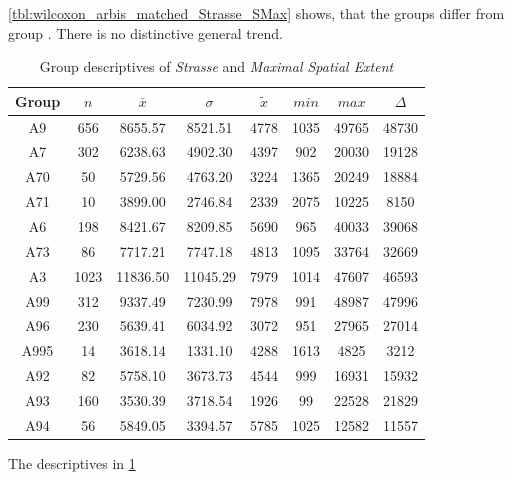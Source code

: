 \cref{tbl:wilcoxon_arbis_matched_Strasse_SMax} shows, that the groups differ from group . There is no distinctive general trend.
\begin{table}[ht!]
	\tiny
	\centering
	\begin{tabular}{c|c|c|c|c|c|c|c}
		\toprule
		Group & $n$ & $\bar{x}$ & $\sigma$ & $\tilde{x}$ & $min$ & $max$ & $\Delta$ \\
		\midrule
		A9   & 656  & 8655.57  & 8521.51  & 4778 & 1035 & 49765 & 48730 \\ 
		A7   & 302  & 6238.63  & 4902.30  & 4397 & 902  & 20030 & 19128 \\ 
		A70  & 50   & 5729.56  & 4763.20  & 3224 & 1365 & 20249 & 18884 \\ 
		A71  & 10   & 3899.00  & 2746.84  & 2339 & 2075 & 10225 & 8150  \\ 
		A6   & 198  & 8421.67  & 8209.85  & 5690 & 965  & 40033 & 39068 \\ 
		A73  & 86   & 7717.21  & 7747.18  & 4813 & 1095 & 33764 & 32669 \\ 
		A3   & 1023 & 11836.50 & 11045.29 & 7979 & 1014 & 47607 & 46593 \\ 
		A99  & 312  & 9337.49  & 7230.99  & 7978 & 991  & 48987 & 47996 \\ 
		A96  & 230  & 5639.41  & 6034.92  & 3072 & 951  & 27965 & 27014 \\ 
		A995 & 14   & 3618.14  & 1331.10  & 4288 & 1613 & 4825  & 3212  \\ 
		A92  & 82   & 5758.10  & 3673.73  & 4544 & 999  & 16931 & 15932 \\ 
		A93  & 160  & 3530.39  & 3718.54  & 1926 & 99   & 22528 & 21829 \\ 
		A94  & 56   & 5849.05  & 3394.57  & 5785 & 1025 & 12582 & 11557 \\ 
		\bottomrule
	\end{tabular}
	\caption{Group descriptives of \textit{Strasse} and \textit{Maximal Spatial Extent}}
	\label{tbl:descriptives_arbis_matched_Strasse_SMax}
\end{table}
The descriptives in \cref{tbl:descriptives_arbis_matched_Strasse_SMax}

